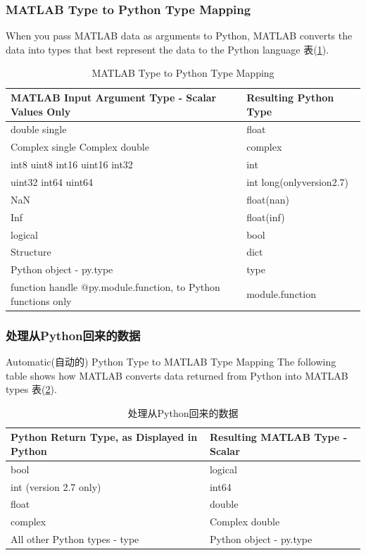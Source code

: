         \subsubsection{MATLAB Type to Python Type Mapping}
            When you pass MATLAB data as arguments to Python, MATLAB converts the data into types that best represent the data to the Python language 表(\ref{MATLAB Type to Python Type Mapping}).
            \begin{table}[htbp]
              \centering
              \caption{MATLAB Type to Python Type Mapping}
              \label{MATLAB Type to Python Type Mapping}
              \begin{tabular}{l|l}
              \toprule
              MATLAB Input Argument Type - Scalar Values Only& Resulting Python Type \\
              \midrule
              double single & float\\
              Complex single Complex double & complex\\
              int8 uint8 int16 uint16 int32 & int\\
              uint32 int64 uint64 & int long(onlyversion2.7)\\
              NaN& float(nan)\\
              Inf &float(inf)\\
              logical &bool\\
              Structure& dict\\
              Python object - py.type& type\\
              function handle $@$py.module.function, to Python functions only & module.function\\
              \bottomrule
              \end{tabular}
            \end{table}
        \subsubsection{处理从Python回来的数据}
            Automatic(自动的) Python Type to MATLAB Type Mapping The following table shows how MATLAB converts data returned from Python into MATLAB types 表(\ref{处理从Python回来的数据}).
            \begin{table}[H]
              \centering
              \caption{处理从Python回来的数据}
              \label{处理从Python回来的数据}
              \begin{tabular}{l|l}
              \toprule
              Python Return Type, as Displayed in Python& Resulting MATLAB Type - Scalar \\
              \midrule
              bool & logical\\
              int (version 2.7 only) & int64\\
              float & double\\
              complex & Complex double\\
              All other Python types - type& Python object - py.type\\
              \bottomrule
              \end{tabular}
            \end{table}

